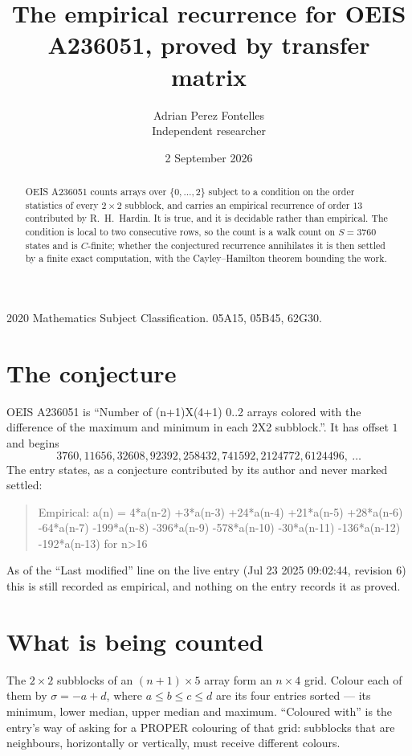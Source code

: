 \documentclass[11pt,a4paper]{article}
\title{The empirical recurrence for OEIS A236051, proved by transfer matrix}
\author{Adrian Perez Fontelles\\ \small Independent researcher}
\date{2 September 2026}
\theoremstyle{plain}
\theoremstyle{definition}
\begin{document}
\maketitle

\begin{abstract}
OEIS A236051 counts arrays over $\{0,\dots,2\}$ subject to a condition on the order
statistics of every $2\times2$ subblock, and carries an empirical recurrence of order
$13$ contributed by R.~H.~Hardin. It is true, and it is decidable rather than empirical.
The condition is local to two consecutive rows, so the count is a walk count on $S=3760$
states and is $C$-finite; whether the conjectured recurrence annihilates it is then settled by
a finite exact computation, with the Cayley--Hamilton theorem bounding the work.
\end{abstract}

\noindent\small 2020 Mathematics Subject Classification. 05A15, 05B45, 62G30.\normalsize

\section{The conjecture}

OEIS A236051 is ``Number of (n+1)X(4+1) 0..2 arrays colored with the difference of the maximum and minimum in each 2X2 subblock.''. It has offset $1$ and begins
\[
3760, 11656, 32608, 92392, 258432, 741592, 2124772, 6124496,\ \dots
\]
The entry states, as a conjecture contributed by its author and never marked settled:
\begin{quote}
Empirical: a(n) = 4*a(n-2) +3*a(n-3) +24*a(n-4) +21*a(n-5) +28*a(n-6) -64*a(n-7) -199*a(n-8) -396*a(n-9) -578*a(n-10) -30*a(n-11) -136*a(n-12) -192*a(n-13) for n>16
\end{quote}
As of the ``Last modified'' line on the live entry (Jul 23 2025 09:02:44, revision 6) this is still
recorded as empirical, and nothing on the entry records it as proved.

\section{What is being counted}

The $2\times2$ subblocks of an $(n+1)\times5$ array form an
$n\times4$ grid. Colour each of them by $\sigma=-a+d$, where $a\le b\le c\le d$ are its four entries sorted --- its minimum, lower median, upper median and maximum. ``Coloured with'' is the entry's way of
asking for a PROPER colouring of that grid: subblocks that are neighbours, horizontally or
vertically, must receive different colours.
\end{document}

